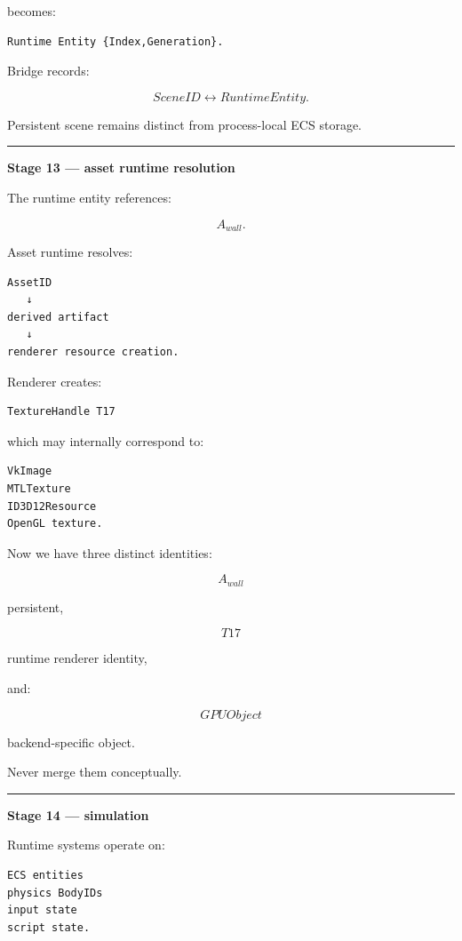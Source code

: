 becomes:

\begin{verbatim}
Runtime Entity {Index,Generation}.
\end{verbatim}

Bridge records:

\[
SceneID
\leftrightarrow
RuntimeEntity.
\]

Persistent scene remains distinct from process-local ECS storage.

\begin{center}\rule{0.5\linewidth}{0.5pt}\end{center}

\textbf{Stage 13 --- asset runtime resolution}

The runtime entity references:

\[
A_{wall}.
\]

Asset runtime resolves:

\begin{verbatim}
AssetID
   ↓
derived artifact
   ↓
renderer resource creation.
\end{verbatim}

Renderer creates:

\begin{verbatim}
TextureHandle T17
\end{verbatim}

which may internally correspond to:

\begin{verbatim}
VkImage
MTLTexture
ID3D12Resource
OpenGL texture.
\end{verbatim}

Now we have three distinct identities:

\[
A_{wall}
\]

persistent,

\[
T17
\]

runtime renderer identity,

and:

\[
GPUObject
\]

backend-specific object.

Never merge them conceptually.

\begin{center}\rule{0.5\linewidth}{0.5pt}\end{center}

\textbf{Stage 14 --- simulation}

Runtime systems operate on:

\begin{verbatim}
ECS entities
physics BodyIDs
input state
script state.
\end{verbatim}


